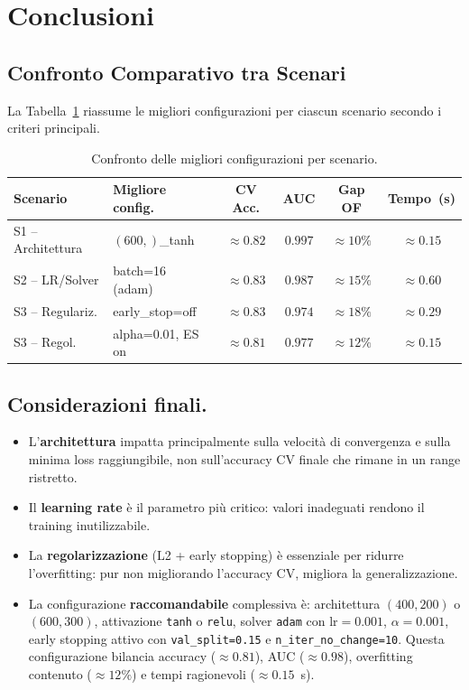 \documentclass[11pt,a4paper]{article}
\begin{document}
 
\section{Conclusioni}
\subsection{Confronto Comparativo tra Scenari}
 
La Tabella~\ref{tab:confronto} riassume le migliori configurazioni per
ciascun scenario secondo i criteri principali.
 
\begin{table}[H]
\centering
\caption{Confronto delle migliori configurazioni per scenario.}
\label{tab:confronto}
\begin{tabular}{llcccc}
\toprule
\textbf{Scenario} & \textbf{Migliore config.} & \textbf{CV Acc.} &
\textbf{AUC} & \textbf{Gap OF} & \textbf{Tempo~(s)}\\
\midrule
S1 -- Architettura & $(600,)$\_tanh       & $\approx 0.82$ & $0.997$ & $\approx 10\%$ & $\approx 0.15$ \\
S2 -- LR/Solver    & batch=16 (adam)      & $\approx 0.83$ & $0.987$ & $\approx 15\%$ & $\approx 0.60$ \\
S3 -- Regulariz.   & early\_stop=off      & $\approx 0.83$ & $0.974$ & $\approx 18\%$ & $\approx 0.29$ \\
\midrule
S3 -- Regol.       & alpha=0.01, ES on    & $\approx 0.81$ & $0.977$ & $\approx 12\%$ & $\approx 0.15$ \\
\bottomrule
\end{tabular}
\end{table}
 
\subsection{Considerazioni finali.}
\begin{itemize}[leftmargin=*]
  \item L'\textbf{architettura} impatta principalmente sulla velocità di
        convergenza e sulla minima loss raggiungibile, non sull'accuracy
        CV finale che rimane in un range ristretto.
  \item Il \textbf{learning rate} è il parametro più critico: valori
        inadeguati rendono il training inutilizzabile.
  \item La \textbf{regolarizzazione} (L2 + early stopping) è essenziale
        per ridurre l'overfitting: pur non migliorando l'accuracy CV,
        migliora la generalizzazione.
  \item La configurazione \textbf{raccomandabile} complessiva è:
        architettura $(400,200)$ o $(600,300)$, attivazione \texttt{tanh}
        o \texttt{relu}, solver \texttt{adam} con $\text{lr}=0.001$,
        $\alpha=0.001$, early stopping attivo con \texttt{val\_split=0.15}
        e \texttt{n\_iter\_no\_change=10}. Questa configurazione
        bilancia accuracy ($\approx 0.81$), AUC ($\approx 0.98$),
        overfitting contenuto ($\approx 12\%$) e tempi ragionevoli
        ($\approx 0.15$~s).
\end{itemize}
\end{document}
